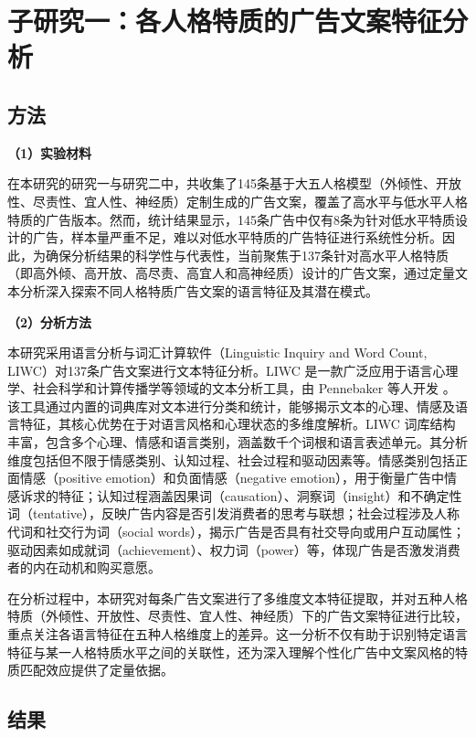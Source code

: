 \section{子研究一：各人格特质的广告文案特征分析} 
\label{study3-substudy1}

\subsection{方法}
\label{LIWC}

\textbf{（1）实验材料}

在本研究的研究一与研究二中，共收集了145条基于大五人格模型（外倾性、开放性、尽责性、宜人性、神经质）定制生成的广告文案，覆盖了高水平与低水平人格特质的广告版本。然而，统计结果显示，145条广告中仅有8条为针对低水平特质设计的广告，样本量严重不足，难以对低水平特质的广告特征进行系统性分析。因此，为确保分析结果的科学性与代表性，当前聚焦于137条针对高水平人格特质（即高外倾、高开放、高尽责、高宜人和高神经质）设计的广告文案，通过定量文本分析深入探索不同人格特质广告文案的语言特征及其潜在模式。

\textbf{（2）分析方法}

本研究采用语言分析与词汇计算软件（Linguistic Inquiry and Word Count, LIWC）对137条广告文案进行文本特征分析。LIWC 是一款广泛应用于语言心理学、社会科学和计算传播学等领域的文本分析工具，由 Pennebaker 等人开发 \citep{pennebaker2007linguistic}。该工具通过内置的词典库对文本进行分类和统计，能够揭示文本的心理、情感及语言特征，其核心优势在于对语言风格和心理状态的多维度解析。LIWC 词库结构丰富，包含多个心理、情感和语言类别，涵盖数千个词根和语言表述单元。其分析维度包括但不限于情感类别、认知过程、社会过程和驱动因素等。情感类别包括正面情感（positive emotion）和负面情感（negative emotion），用于衡量广告中情感诉求的特征；认知过程涵盖因果词（causation）、洞察词（insight）和不确定性词（tentative），反映广告内容是否引发消费者的思考与联想；社会过程涉及人称代词和社交行为词（social words），揭示广告是否具有社交导向或用户互动属性；驱动因素如成就词（achievement）、权力词（power）等，体现广告是否激发消费者的内在动机和购买意愿。

在分析过程中，本研究对每条广告文案进行了多维度文本特征提取，并对五种人格特质（外倾性、开放性、尽责性、宜人性、神经质）下的广告文案特征进行比较，重点关注各语言特征在五种人格维度上的差异。这一分析不仅有助于识别特定语言特征与某一人格特质水平之间的关联性，还为深入理解个性化广告中文案风格的特质匹配效应提供了定量依据。


\subsection{结果}

